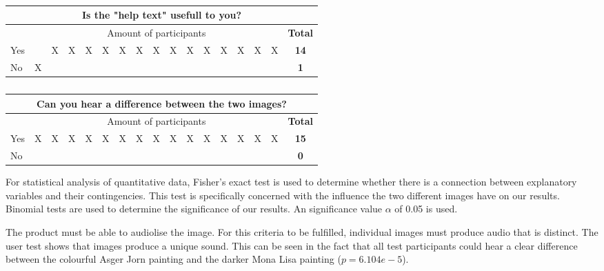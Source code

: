 \begin{table}[!h]
\centering
\caption{}
\label{tab:helptext}
\begin{tabular}{|l|c|c|c|c|c|c|c|c|c|c|c|c|c|c|c|c|}
\hline
\multicolumn{17}{|c|}{Is the "help text" usefull to you?} \\ \hline
 & \multicolumn{15}{c|}{Amount of participants} & \textbf{Total} \\ \hline
Yes &  & X & X & X & X & X & X & X & X & X & X & X & X & X & X & \textbf{14} \\ \hline
No & X &  &  &  &  &  &  &  &  &  &  &  &  &  &  & \textbf{1} \\ \hline
\end{tabular}
\end{table}

\begin{table}[!h]
\centering
\caption{}
\label{tab:twoimagedifference}
\begin{tabular}{|l|c|c|c|c|c|c|c|c|c|c|c|c|c|c|c|c|}
\hline
\multicolumn{17}{|c|}{Can you hear a difference between the two images?} \\ \hline
 & \multicolumn{15}{c|}{Amount of participants} & \textbf{Total} \\ \hline
Yes & X & X & X & X & X & X & X & X & X & X & X & X & X & X & X & \textbf{15} \\ \hline
No &  &  &  &  &  &  &  &  &  &  &  &  &  &  &  & \textbf{0} \\ \hline
\end{tabular}
\end{table}

For statistical analysis of quantitative data, Fisher's exact test is used to determine whether there is a connection between explanatory variables and their contingencies. This test is specifically concerned with the influence the two different images have on our results. Binomial tests are used to determine the significance of our results. An significance value $\alpha$ of 0.05 is used.

The product must be able to audiolise the image. For this criteria to be fulfilled, individual images must produce audio that is distinct. The user test shows that images produce a unique sound. This can be seen in the fact that all test participants could hear a clear difference between the colourful Asger Jorn painting and the darker Mona Lisa painting ($p=6.104e-5$). 

